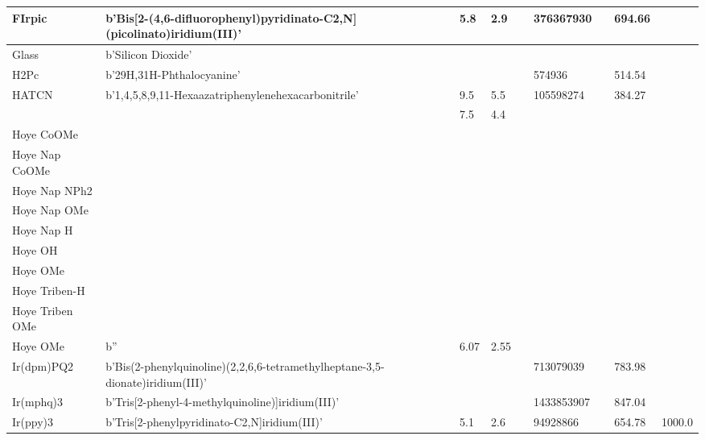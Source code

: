 \documentclass[../thesis.tex]{subfiles}
\begin{document}
\begin{landscape}
\begin{longtable}{| p{} | p{} | p{} | p{} | p{} | p{} | p{} | p{} | p{} | p{} | }
 \hline 
FIrpic & b'Bis[2-(4,6-difluorophenyl)pyridinato-C2,N](picolinato)iridium(III)' &  & 5.8 & 2.9 &  & 376367930 &  & 694.66 &  \\ 
 
 \hline 
Glass & b'Silicon Dioxide' &  &  &  &  &  &  &  &  \\ 
 
 \hline 
H2Pc & b'29H,31H-Phthalocyanine' &  &  &  &  & 574936 &  & 514.54 &  \\ 
 
 \hline 
HATCN & b'1,4,5,8,9,11-Hexaazatriphenylenehexacarbonitrile' &  & 9.5 & 5.5 &  & 105598274 &  & 384.27 &  \\ 
 & &  & 7.5 & 4.4 &  &  & & & \\ 
 
 \hline 
Hoye CoOMe &  &  &  &  &  &  &  &  &  \\ 
 
 \hline 
Hoye Nap CoOMe &  &  &  &  &  &  &  &  &  \\ 
 
 \hline 
Hoye Nap NPh2 &  &  &  &  &  &  &  &  &  \\ 
 
 \hline 
Hoye Nap OMe &  &  &  &  &  &  &  &  &  \\ 
 
 \hline 
Hoye Nap H &  &  &  &  &  &  &  &  &  \\ 
 
 \hline 
Hoye OH &  &  &  &  &  &  &  &  &  \\ 
 
 \hline 
Hoye OMe &  &  &  &  &  &  &  &  &  \\ 
 
 \hline 
Hoye Triben-H &  &  &  &  &  &  &  &  &  \\ 
 
 \hline 
Hoye Triben OMe &  &  &  &  &  &  &  &  &  \\ 
 
 \hline 
Hoye OMe & b'' &  & 6.07 & 2.55 &  &  &  &  &  \\ 
 
 \hline 
Ir(dpm)PQ2 & b'Bis(2-phenylquinoline)(2,2,6,6-tetramethylheptane-3,5-dionate)iridium(III)' &  &  &  &  & 713079039 &  & 783.98 &  \\ 
 
 \hline 
Ir(mphq)3 & b'Tris[2-phenyl-4-methylquinoline)]iridium(III)' &  &  &  &  & 1433853907 &  & 847.04 &  \\ 
 
 \hline 
Ir(ppy)3 & b'Tris[2-phenylpyridinato-C2,N]iridium(III)' &  & 5.1 & 2.6 &  & 94928866 &  & 654.78 & 1000.0 \\ 
 

\end{longtable}
\end{landscape}
\end{document}
